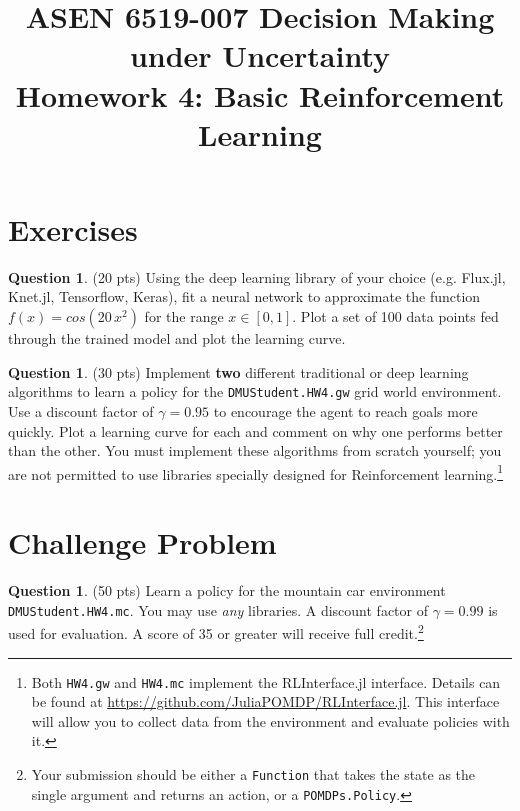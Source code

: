 \documentclass{article}
\title{ASEN 6519-007 Decision Making under Uncertainty\\
       Homework 4: Basic Reinforcement Learning}
\theoremstyle{definition}
\newtheorem{question}[thm]{Question}
\begin{document}
\maketitle

\section{Exercises}

\begin{question}
    (20 pts) Using the deep learning library of your choice (e.g. Flux.jl, Knet.jl, Tensorflow, Keras), fit a neural network to approximate the function $f(x) = cos(20\,x^2)$ for the range $x \in [0,1]$. Plot a set of 100 data points fed through the trained model and plot the learning curve.
\end{question}

\begin{question}
    (30 pts) Implement \textbf{two} different traditional or deep learning algorithms to learn a policy for the \texttt{DMUStudent.HW4.gw} grid world environment. Use a discount factor of $\gamma=0.95$ to encourage the agent to reach goals more quickly. Plot a learning curve for each and comment on why one performs better than the other. You must implement these algorithms from scratch yourself; you are not permitted to use libraries specially designed for Reinforcement learning.\footnote{\label{fn:rlinterface}Both \texttt{HW4.gw} and \texttt{HW4.mc} implement the RLInterface.jl interface. Details can be found at \url{https://github.com/JuliaPOMDP/RLInterface.jl}. This interface will allow you to collect data from the environment and evaluate policies with it.}
\end{question}

\section{Challenge Problem}

\begin{question}
    (50 pts) Learn a policy for the mountain car environment \texttt{DMUStudent.HW4.mc}. You may use \emph{any} libraries. A discount factor of $\gamma=0.99$ is used for evaluation. A score of 35 or greater will receive full credit.\footnotemark[1]\footnote{Your submission should be either a \texttt{Function} that takes the state as the single argument and returns an action, or a \texttt{POMDPs.Policy}.}
\end{question}
\end{document}
